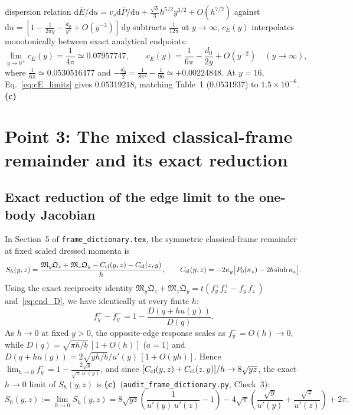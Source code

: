 \documentclass[11pt,a4paper]{article}
\newcommand{\Lc}{\textsf{\textbf{(c)}}\ }
\newcommand{\scr}{\texttt{audit\_\allowbreak frame\_\allowbreak dictionary.py}}
\newcommand{\dd}{\mathrm d}
\begin{document}
\begin{enumerate}
dispersion relation $\dd\overline E/\dd u=v_s\dd\overline P/\dd u+\frac{\sqrt b}{3}h^{5/2}y^{3/2}+O(h^{7/2})$
against $\dd u=[1-\frac{1}{2\pi y}-\frac{d_0}{y^2}+O(y^{-3})]\,\dd y$ subtracts
$\frac{1}{12\pi}$ at $y\to\infty$, $c_E(y)$ interpolates monotonically between exact
analytical endpoints:
\begin{equation}\label{eq:cE_limits}
 \lim_{y\to 0^+}c_E(y)=\frac{1}{4\pi}\simeq 0.07957747,\qquad
 c_E(y)=\frac{1}{6\pi}-\frac{d_0}{2y}+O(y^{-2})\quad (y\to\infty),
\end{equation}
where $\frac{1}{6\pi}\simeq 0.0530516477$ and
$-\frac{d_0}{2}=\frac{1}{8\pi^2}-\frac{1}{96}\simeq +0.00224848$. At $y=16$,
Eq.~\eqref{eq:cE_limits} gives $0.05319218$, matching Table~1 ($0.0531937$) to
$1.5\times 10^{-6}$. \Lc
\end{enumerate}

\section{Point 3: The mixed classical-frame remainder and its exact reduction}

\subsection{Exact reduction of the edge limit to the one-body Jacobian}
In Section~5 of \texttt{frame\_\allowbreak dictionary.tex}, the symmetric classical-frame
remainder at fixed scaled dressed momenta is
\[
 S_h(y,z)=\frac{\mathfrak M_y\mathfrak Q_z+\mathfrak M_z\mathfrak Q_y
 -C_{\rm cl}(y,z)-C_{\rm cl}(z,y)}{h},\qquad
 C_{\rm cl}(y,z)=-2\kappa_y\big[P_0(\kappa_z)-2b\sinh\kappa_z\big].
\]
Using the exact reciprocity identity $\mathfrak M_y\mathfrak Q_z+\mathfrak M_z\mathfrak Q_y
=t(f_y^+f_z^+-f_y^-f_z^-)$ and~\eqref{eq:end_D}, we have identically at every finite $h$:
\[
 f_y^+-f_y^-=1-\frac{D(q+hu(y))}{D(q)}.
\]
As $h\to 0$ at fixed $y>0$, the opposite-edge response scales as $f_y^-=O(h)\to 0$,
while $D(q)=\sqrt{\pi h/b}\,[1+O(h)]$ ($a=1$) and
$D(q+hu(y))=2\sqrt{yh/b}/u'(y)\,[1+O(yh)]$. Hence
$\lim_{h\to 0}f_y^+=1-\frac{2\sqrt y}{\sqrt\pi\,u'(y)}$, and since
$[C_{\rm cl}(y,z)+C_{\rm cl}(z,y)]/h\to 8\sqrt{yz}$, the exact $h\to 0$ limit of
$S_h(y,z)$ is \Lc (\scr, Check~3):
\begin{equation}\label{eq:S0_exact}
 \boxed{S_0(y,z):=\lim_{h\to 0}S_h(y,z)
 =8\sqrt{yz}\left(\frac{1}{u'(y)\,u'(z)}-1\right)
  -4\sqrt\pi\left(\frac{\sqrt y}{u'(y)}+\frac{\sqrt z}{u'(z)}\right)+2\pi.}
\end{equation}
\end{document}
